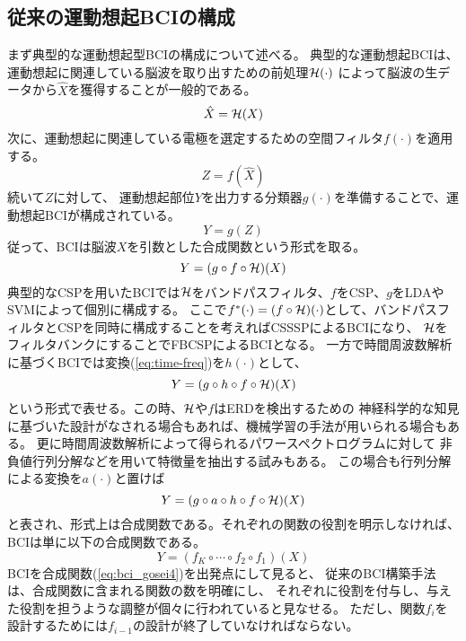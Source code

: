 \subsection{従来の運動想起BCIの構成}
まず典型的な運動想起型BCIの構成について述べる。
典型的な運動想起BCIは、運動想起に関連している脳波を取り出すための前処理\(\cal H(\cdot)\)
によって脳波の生データから\(\hat X\)を獲得することが一般的である。
\begin{equation}
    \hat X = {\cal H}(X)
    \label{eq:bandpass}
\end{equation}
次に、運動想起に関連している電極を選定するための空間フィルタ\(f(\cdot)\)を適用する。
\begin{equation}
    Z = f(\hat X)
    \label{eq:spatfilter}
\end{equation}
続いて\(Z\)に対して、
運動想起部位\(Y\)を出力する分類器\(g(\cdot)\)を準備することで、運動想起BCIが構成されている。
\begin{equation}
    Y = g(Z)
    \label{eq:classifier}
\end{equation}
従って、BCIは脳波\(X\)を引数とした合成関数という形式を取る。
\begin{equation}
    Y = (g\circ f \circ {\cal H})(X)
    \label{eq:bci_gosei}
\end{equation}
典型的なCSPを用いたBCIでは\(\cal H\)をバンドパスフィルタ、\(f\)をCSP、\(g\)をLDAやSVMによって個別に構成する。
ここで\(f^*(\cdot)=(f\circ{\cal H})(\cdot)\)として、バンドパスフィルタとCSPを同時に構成することを考えればCSSSPによるBCIになり、
\(\cal H\)をフィルタバンクにすることでFBCSPによるBCIとなる。
一方で時間周波数解析に基づくBCIでは変換(\ref{eq:time-freq})を\(h(\cdot)\)として、
\begin{equation}
    Y = (g\circ h \circ f \circ {\cal H})(X)
    \label{eq:bci_gosei2}
\end{equation}
という形式で表せる。この時、\(\cal H\)や\(f\)はERDを検出するための
神経科学的な知見に基づいた設計がなされる場合もあれば、機械学習の手法が用いられる場合もある。
更に時間周波数解析によって得られるパワースペクトログラムに対して
非負値行列分解などを用いて特徴量を抽出する試みもある\cite{kNMF,kNMF2}。
この場合も行列分解による変換を\(a(\cdot)\)と置けば
\begin{equation}
    Y = (g\circ a\circ h\circ f\circ {\cal H})(X)
    \label{eq:bci_gosei3}
\end{equation}
と表され、形式上は合成関数である。それぞれの関数の役割を明示しなければ、BCIは単に以下の合成関数である。
\begin{equation}
    Y = (f_K\circ \cdots \circ f_2\circ f_1)(X)
    \label{eq:bci_gosei4}
\end{equation}
BCIを合成関数(\ref{eq:bci_gosei4})を出発点にして見ると、
従来のBCI構築手法は、合成関数に含まれる関数の数を明確にし、
それぞれに役割を付与し、与えた役割を担うような調整が個々に行われていると見なせる。
ただし、関数\(f_i\)を設計するためには\(f_{i-1}\)の設計が終了していなければならない。

